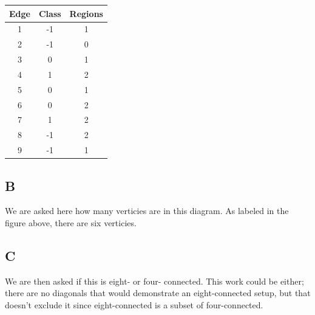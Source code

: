 \documentclass{article}
\begin{document}
\begin{center}
    \begin{tabular}{| c | c | c |}
        Edge & Class & Regions \\
        \hline
        1 & -1 & 1 \\
        2 & -1 & 0 \\
        3 & 0 & 1 \\
        4 & 1 & 2 \\
        5 & 0 & 1 \\
        6 & 0 & 2 \\
        7 & 1 & 2 \\
        8 & -1 & 2 \\
        9 & -1 & 1
    \end{tabular}
\end{center}

\subsection*{B}

We are asked here how many verticies are in this diagram. As labeled in the figure above, there are six verticies.

\subsection*{C}

We are then asked if this is eight- or four- connected. This work could be either; there are no diagonals that would demonstrate an eight-connected setup, but that doesn't exclude it since eight-connected is a subset of four-connected.
\end{document}
